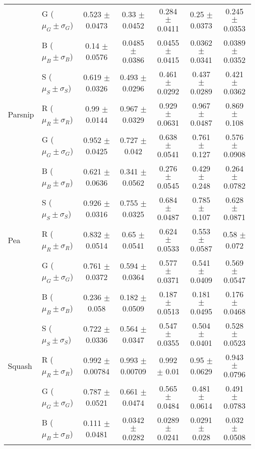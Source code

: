 \documentclass[authoryear]{elsarticle}
\begin{document}
\begin{tabular}{llccccc}
         		 & G ($\mu_G \pm \sigma_G$) & 0.523 $\pm$ 0.0473 & 0.33 $\pm$ 0.0452 & 0.284 $\pm$ 0.0411 & 0.25 $\pm$ 0.0373 & 0.245 $\pm$ 0.0353 \\
          		 & B ($\mu_B \pm \sigma_B$) & 0.14 $\pm$ 0.0576 & 0.0485 $\pm$ 0.0386 & 0.0455 $\pm$ 0.0415 & 0.0362 $\pm$ 0.0341 & 0.0389 $\pm$ 0.0352 \\
          		 & S ($\mu_S \pm \sigma_S$) & 0.619 $\pm$ 0.0326 & 0.493 $\pm$ 0.0296 & 0.461 $\pm$ 0.0292 & 0.437 $\pm$ 0.0289 & 0.421 $\pm$ 0.0362 \\
    \midrule
    Parsnip		 & R ($\mu_R \pm \sigma_R$) & 0.99 $\pm$ 0.0144 & 0.967 $\pm$ 0.0329 & 0.929 $\pm$ 0.0631 & 0.967 $\pm$ 0.0487 & 0.869 $\pm$ 0.108 \\
         		 & G ($\mu_G \pm \sigma_G$) & 0.952 $\pm$ 0.0425 & 0.727 $\pm$ 0.042 & 0.638 $\pm$ 0.0541 & 0.761 $\pm$ 0.127 & 0.576 $\pm$ 0.0908 \\
          		 & B ($\mu_B \pm \sigma_B$) & 0.621 $\pm$ 0.0636 & 0.341 $\pm$ 0.0562 & 0.276 $\pm$ 0.0545 & 0.429 $\pm$ 0.248 & 0.264 $\pm$ 0.0782 \\
          		 & S ($\mu_S \pm \sigma_S$) & 0.926 $\pm$ 0.0316 & 0.755 $\pm$ 0.0325 & 0.684 $\pm$ 0.0487 & 0.785 $\pm$ 0.107 & 0.628 $\pm$ 0.0871 \\
    \midrule
    Pea			 & R ($\mu_R \pm \sigma_R$) & 0.832 $\pm$ 0.0514 & 0.65 $\pm$ 0.0541 & 0.624 $\pm$ 0.0533 & 0.553 $\pm$ 0.0587 & 0.58 $\pm$ 0.072 \\
         		 & G ($\mu_G \pm \sigma_G$) & 0.761 $\pm$ 0.0372 & 0.594 $\pm$ 0.0364 & 0.577 $\pm$ 0.0371 & 0.541 $\pm$ 0.0409 & 0.569 $\pm$ 0.0547 \\
          		 & B ($\mu_B \pm \sigma_B$) & 0.236 $\pm$ 0.058 & 0.182 $\pm$ 0.0509 & 0.187 $\pm$ 0.0513 & 0.181 $\pm$ 0.0495 & 0.176 $\pm$ 0.0468 \\
          		 & S ($\mu_S \pm \sigma_S$) & 0.722 $\pm$ 0.0336 & 0.564 $\pm$ 0.0347 & 0.547 $\pm$ 0.0355 & 0.504 $\pm$ 0.0401 & 0.528 $\pm$ 0.0523 \\
    \midrule         
    Squash		 & R ($\mu_R \pm \sigma_R$) & 0.992 $\pm$ 0.00784 & 0.993 $\pm$ 0.00709 & 0.992 $\pm$ 0.01 & 0.95 $\pm$ 0.0629 & 0.943 $\pm$ 0.0796 \\
         		 & G ($\mu_G \pm \sigma_G$) & 0.787 $\pm$ 0.0521 & 0.661 $\pm$ 0.0474 & 0.565 $\pm$ 0.0484 & 0.481 $\pm$ 0.0614 & 0.491 $\pm$ 0.0783 \\
          		 & B ($\mu_B \pm \sigma_B$) & 0.111 $\pm$ 0.0481 & 0.0342 $\pm$ 0.0282 & 0.0289 $\pm$ 0.0241 & 0.0291 $\pm$ 0.028 & 0.032 $\pm$ 0.0508 \\

\end{tabular}
\end{document}
